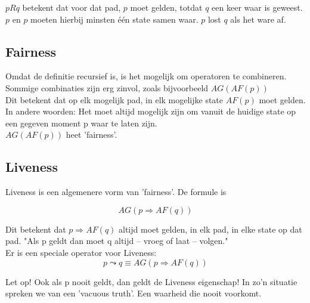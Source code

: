 \documentclass{article}
\begin{document}
		\noindent \(p R q\) betekent dat voor dat pad, \(p\) moet gelden, totdat \(q\) een keer waar is geweest. \(p\) en \(p\) moeten hierbij minsten één state samen waar. \(p\) lost \(q\) als het ware af.
		
		\subsection{Fairness}
				
		Omdat de definitie recursief is, is het mogelijk om operatoren te combineren. Sommige combinaties zijn erg zinvol, zoals bijvoorbeeld \( AG ( AF (p) )\) \\
		Dit betekent dat op elk mogelijk pad, in elk mogelijke state \( AF(p) \) moet gelden. In andere woorden: Het moet altijd mogelijk zijn om vanuit de huidige state op een gegeven moment p waar te laten zijn. \\
		\( AG ( AF ( p ) ) \) heet 'fairness'.
		
		\subsection{Liveness}
			
		Liveness is een algemenere vorm van 'fairness'. De formule is 

		\[ AG (p \Rightarrow AF(q)) \]

		\noindent Dit betekent dat  \( p \Rightarrow AF(q) \) altijd moet gelden, in elk pad, in elke state op dat pad. "Als p geldt dan moet q altijd -- vroeg of laat -- volgen." \\
		Er is een speciale operator voor Liveness:
		\[ p \leadsto q \equiv AG (p \Rightarrow AF (q) ) \]

		\noindent Let op! Ook als p nooit geldt, dan geldt de Liveness eigenschap! In zo'n situatie spreken we van een 'vacuous truth'. Een waarheid die nooit voorkomt.
		
	
	\newpage
	
	
	
	
\end{document}
